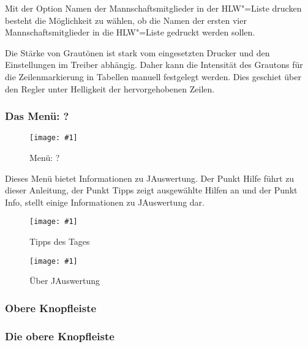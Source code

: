 \documentclass[11pt,a4paper,twoside,ngerman]{article}
\newcommand{\hsmimage}[3]{\begin{figure}[!ht]\centering\texttt{[image: \#1]}\caption{#3}\end{figure}}
\begin{document}
Mit der Option \glqq{}Namen der Mannschaftsmitglieder in der HLW"=Liste drucken\grqq{} besteht die Möglichkeit zu wählen, ob die Namen der ersten vier Mannschaftsmitglieder in die HLW"=Liste gedruckt werden sollen.

Die Stärke von Grautönen ist stark vom eingesetzten Drucker und den Einstellungen im Treiber abhängig. Daher kann die Intensität des Grautons für die Zeilenmarkierung in Tabellen manuell festgelegt werden. Dies geschiet über den Regler unter \glqq{}Helligkeit der hervorgehobenen Zeilen\grqq{}.


\subsubsection*{Das Menü: ?}

\hsmimage{pics/menu-info}{.11\textwidth}{Menü: ?}
Dieses Menü bietet Informationen zu JAuswertung. Der Punkt \glqq{}Hilfe\grqq{} führt zu dieser Anleitung, der Punkt \glqq{}Tipps\grqq{} zeigt ausgewählte Hilfen an und der Punkt \glqq{}Info\grqq{}, stellt einige Informationen zu JAuswertung dar.


\hsmimage{pics/tipps}{.56\textwidth}{Tipps des Tages}

\hsmimage{pics/about}{.60\textwidth}{Über JAuswertung}

\newpage

\subsubsection{Obere Knopfleiste}
\label{lbl:knopfleisteoben::begin}

\subsubsection*{Die obere Knopfleiste}
\end{document}

